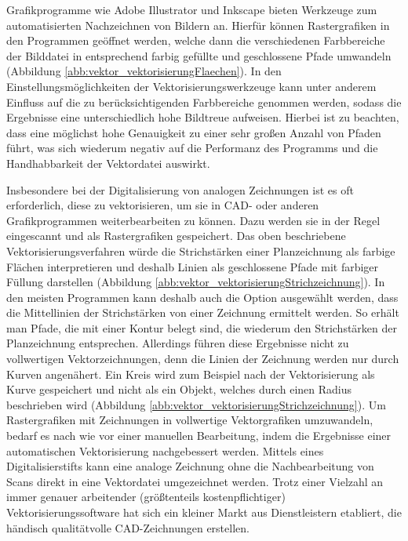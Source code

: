 Grafikprogramme wie Adobe Illustrator und Inkscape bieten Werkzeuge zum automatisierten Nachzeichnen von Bildern an. Hierfür können Rastergrafiken in den Programmen geöffnet werden, welche dann die verschiedenen Farbbereiche der Bilddatei in entsprechend farbig gefüllte und geschlossene Pfade umwandeln (Abbildung \ref{abb:vektor_vektorisierungFlaechen}). In den Einstellungsmöglichkeiten der Vektorisierungswerkzeuge kann unter anderem Einfluss auf die zu berücksichtigenden Farbbereiche genommen werden, sodass die Ergebnisse eine unterschiedlich hohe Bildtreue aufweisen. Hierbei ist zu beachten, dass eine möglichst hohe Genauigkeit zu einer sehr großen Anzahl von Pfaden führt, was sich wiederum negativ auf die Performanz des Programms und die Handhabbarkeit der Vektordatei auswirkt.

Insbesondere bei der Digitalisierung von analogen Zeichnungen ist es oft erforderlich, diese zu vektorisieren, um sie in CAD- oder anderen Grafikprogrammen weiterbearbeiten zu können. Dazu werden sie in der Regel eingescannt und als Rastergrafiken gespeichert. Das oben beschriebene Vektorisierungsverfahren würde die Strichstärken einer Planzeichnung als farbige Flächen interpretieren und deshalb Linien als geschlossene Pfade mit farbiger Füllung darstellen (Abbildung \ref{abb:vektor_vektorisierungStrichzeichnung}). In den meisten Programmen kann deshalb auch die Option ausgewählt werden, dass die Mittellinien der Strichstärken von einer Zeichnung ermittelt werden. So erhält man Pfade, die mit einer Kontur belegt sind, die wiederum den Strichstärken der Planzeichnung entsprechen. Allerdings führen diese Ergebnisse nicht zu vollwertigen Vektorzeichnungen, denn die Linien der Zeichnung werden nur durch Kurven angenähert. Ein Kreis wird zum Beispiel nach der Vektorisierung als Kurve gespeichert und nicht als ein Objekt, welches durch einen Radius beschrieben wird (Abbildung \ref{abb:vektor_vektorisierungStrichzeichnung}). Um Rastergrafiken mit Zeichnungen in vollwertige Vektorgrafiken umzuwandeln, bedarf es nach wie vor einer manuellen Bearbeitung, indem die Ergebnisse einer automatischen Vektorisierung nachgebessert werden. Mittels eines Digitalisierstifts kann eine analoge Zeichnung ohne die Nachbearbeitung von Scans direkt in eine Vektordatei umgezeichnet werden. Trotz einer Vielzahl an immer genauer arbeitender (größtenteils kostenpflichtiger) Vektorisierungssoftware hat sich ein kleiner Markt aus Dienstleistern etabliert, die händisch qualitätvolle CAD-Zeichnungen erstellen.

